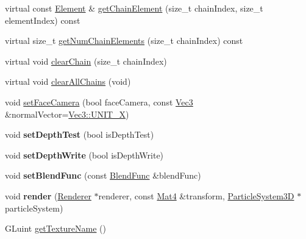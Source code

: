 \begin{DoxyCompactItemize}
\item 
virtual const \hyperlink{classPUBillboardChain_1_1Element}{Element} \& \hyperlink{classPUBillboardChain_ab333fca0952c36d1578d9160d1da6c1a}{get\+Chain\+Element} (size\+\_\+t chain\+Index, size\+\_\+t element\+Index) const
\item 
virtual size\+\_\+t \hyperlink{classPUBillboardChain_a22c3dbee747669828af060bd43f30fdb}{get\+Num\+Chain\+Elements} (size\+\_\+t chain\+Index) const
\item 
virtual void \hyperlink{classPUBillboardChain_a5bb3931ebcca77e14e9f0be4d1bc8dac}{clear\+Chain} (size\+\_\+t chain\+Index)
\item 
virtual void \hyperlink{classPUBillboardChain_a1d54a310061c1d3158b672e618fa49b5}{clear\+All\+Chains} (void)
\item 
void \hyperlink{classPUBillboardChain_a3cf5eab8b485ab9cafd87fd58623a288}{set\+Face\+Camera} (bool face\+Camera, const \hyperlink{classVec3}{Vec3} \&normal\+Vector=\hyperlink{classVec3_a859e21c0e95524033d5322f815127ff3}{Vec3\+::\+U\+N\+I\+T\+\_\+X})
\item 
\mbox{\label{classPUBillboardChain_ac4bed36e4fc5ca9c73d4848b58117937}} 
void {\bfseries set\+Depth\+Test} (bool is\+Depth\+Test)
\item 
\mbox{\label{classPUBillboardChain_a75ea76ccea6fb04dac12f2e38539f4dc}} 
void {\bfseries set\+Depth\+Write} (bool is\+Depth\+Write)
\item 
\mbox{\label{classPUBillboardChain_acf3686a91866d52da57fe2924b079c8a}} 
void {\bfseries set\+Blend\+Func} (const \hyperlink{structBlendFunc}{Blend\+Func} \&blend\+Func)
\item 
\mbox{\label{classPUBillboardChain_ac27d8d9b2c29320ac816b686805d050b}} 
void {\bfseries render} (\hyperlink{classRenderer}{Renderer} $\ast$renderer, const \hyperlink{classMat4}{Mat4} \&transform, \hyperlink{classParticleSystem3D}{Particle\+System3D} $\ast$particle\+System)
\item 
G\+Luint \hyperlink{classPUBillboardChain_adb77f3cfeaaeee1e3e7d80396af2767f}{get\+Texture\+Name} ()
\end{DoxyCompactItemize}
